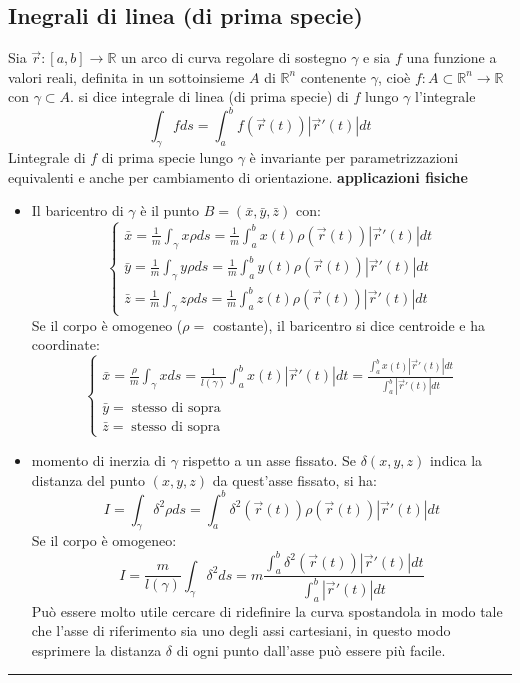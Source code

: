 \subsection*{Inegrali di linea (di prima specie)}
Sia $\vec{r}: [a,b] \rightarrow \mathbb{R}$ un arco di curva regolare di sostegno $\gamma$ e sia $f$ una funzione a valori reali, definita in un sottoinsieme $A$ di $\mathbb{R}^n$ contenente $\gamma$, cioè $f:A\subset \mathbb{R}^n \rightarrow \mathbb{R}$ con $\gamma \subset A$. si dice integrale di linea (di prima specie) di $f$ lungo $\gamma$ l'integrale
\[
    \int_{\gamma} f ds = \int_{a}^{b}f(\vec{r}(t))|\vec{r}'(t)|dt
\]
Lintegrale di $f$ di prima specie lungo $\gamma$ è invariante per parametrizzazioni equivalenti e anche per cambiamento di orientazione.\newline
\newline
\textbf{applicazioni fisiche}
\begin{tcolorbox}
\begin{itemize}
    \item Il baricentro di $\gamma$ è il punto $B = (\bar{x},\bar{y},\bar{z})$ con:
    \[
        \begin{cases}
            \bar{x} = \frac{1}{m}\int_\gamma x\rho ds = \frac{1}{m}\int_{a}^{b}x(t)\rho(\vec{r}(t))|\vec{r}'(t)|dt\\
            \bar{y} = \frac{1}{m}\int_\gamma y\rho ds = \frac{1}{m}\int_{a}^{b}y(t)\rho(\vec{r}(t))|\vec{r}'(t)|dt\\
            \bar{z} = \frac{1}{m}\int_\gamma z\rho ds = \frac{1}{m}\int_{a}^{b}z(t)\rho(\vec{r}(t))|\vec{r}'(t)|dt
        \end{cases}
    \]
    Se il corpo è omogeneo ($\rho =$ costante), il baricentro si dice centroide e ha coordinate:
    \[
        \begin{cases}
            \bar{x} = \frac{\rho}{m}\int_\gamma x ds = \frac{1}{l(\gamma)}\int_{a}^{b}x(t)|\vec{r}'(t)|dt = \frac{\int_{a}^{b}x(t)|\vec{r}'(t)|dt}{\int_{a}^{b}|\vec{r}'(t)|dt}\\
            \bar{y} = \;\text{stesso di sopra}\\   
            \bar{z} = \;\text{stesso di sopra}
        \end{cases}
    \]
    \item momento di inerzia di $\gamma$ rispetto a un asse fissato. Se $\delta(x,y,z)$ indica la distanza del punto $(x,y,z)$ da quest'asse fissato, si ha:
    \[
        I = \int_\gamma \delta^2 \rho ds = \int_{a}^{b}\delta^2(\vec{r}(t))\rho(\vec{r}(t))|\vec{r}'(t)|dt
    \]
    Se il corpo è omogeneo:
    \[
        I = \frac{m}{l(\gamma)}\int_\gamma \delta^2ds = m \frac{\int_{a}^{b}\delta^2(\vec{r}(t))|\vec{r}'(t)|dt}{\int_{a}^{b}|\vec{r}'(t)|dt}
    \]
    Può essere molto utile cercare di ridefinire la curva spostandola in modo tale che l'asse di riferimento sia uno degli assi cartesiani, in questo modo esprimere la distanza $\delta$ di ogni punto dall'asse può essere più facile.
\end{itemize}
\end{tcolorbox}
\rule{\textwidth}{2pt}
